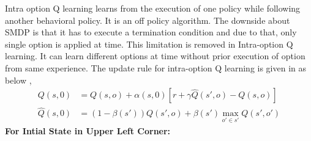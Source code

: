 \documentclass[preprint,12pt]{elsarticle}
\begin{document}
Intra option Q learning learns from the execution of one policy while following another behavioral policy. It is an off policy algorithm. The downside about SMDP is that it has to execute a termination condition and due to that, only single option is applied at time. This limitation is removed in Intra-option Q learning. It can learn different options at time without prior execution of option from same experience. The update rule for intra-option Q learning is given in as below \cite{sutton1998intra},
\begin{equation}
\begin{aligned}
Q(s,0) &= Q(s,o) + \alpha(s,0) [r+\gamma \hat{Q}(s',o) - Q(s,o)] \\
\hat{Q}(s,0) &= (1-\beta(s')) Q(s',o) + \beta(s')  \max_{o'\in s'} Q(s',o')
\end{aligned}
\end{equation}
\textbf{For Intial State in Upper Left Corner:} 
\end{document}
